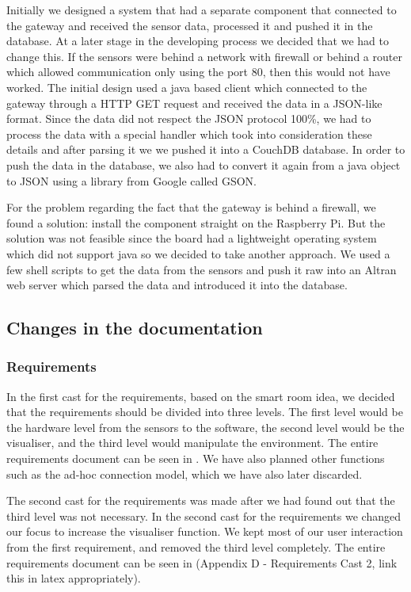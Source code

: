 \documentclass[../document.tex]{subfiles}
\begin{document}
Initially we designed a system that had a separate component that connected to the gateway and received the sensor data, processed it and pushed it in the database. At a later stage in the developing process we decided that we had to change this. If the sensors were behind a network with firewall or behind a router which allowed communication only using the port 80, then this would not have worked. The initial design used a java based client which connected to the gateway through a HTTP GET request and received the data in a JSON-like format. Since the data did not respect the JSON protocol 100\%, we had to process the data with a special handler which took into consideration these details and after parsing it we we pushed it into a CouchDB database. In order to push the data in the database, we also had to convert it again from a java object to JSON using a library from Google called GSON. 

For the problem regarding the fact that the gateway is behind a firewall, we found a solution: install the component straight on the Raspberry Pi. But the solution was not feasible since the board had a lightweight operating system which did not support java so we decided to take another approach. We used a few shell scripts to get the data from the sensors and push it raw into an Altran web server which parsed the data and introduced it into the database.

\subsection{Changes in the documentation}

\subsubsection{Requirements}
In the first cast for the requirements, based on the smart room idea, we decided that the requirements should be divided into three levels. The first level would be the hardware level from the sensors to the software, the second level would be the visualiser, and the third level would manipulate the environment. The entire requirements document can be seen in . We have also planned other functions such as the ad-hoc connection model, which we have also later discarded. 

The second cast for the requirements was made after we had found out that the third level was not necessary. In the second cast for the requirements we changed our focus to increase the visualiser function. We kept most of our user interaction from the first requirement, and removed the third level completely. The entire requirements document can be seen in (Appendix D - Requirements Cast 2, link this in latex appropriately).
\end{document}
